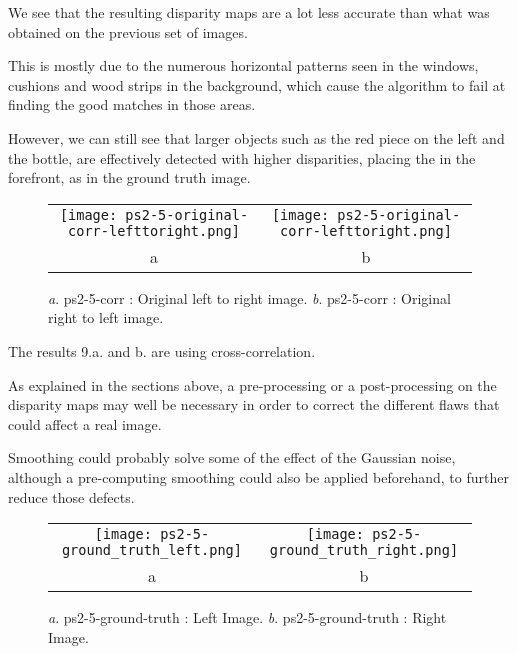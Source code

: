 \documentclass[a4paper,11pt]{article}
\begin{document}
We see that the resulting disparity maps are a lot less accurate than what was obtained on the previous set of images.

This is mostly due to the numerous horizontal patterns seen in the windows, cushions and wood strips in the background, which cause the algorithm to fail at finding the good matches in those areas.

However, we can still see that larger objects such as the red piece on the left and the bottle, are effectively detected with higher disparities, placing the in the forefront, as in the ground truth image.

 \begin{figure}[H]
\begin{center}
\begin{tabular}{cc}
	\texttt{[image: ps2-5-original-corr-lefttoright.png]}&
	\texttt{[image: ps2-5-original-corr-lefttoright.png]}\\
	a&b
\end{tabular}
\end{center}
\caption{ 
\textit{a}. ps2-5-corr : Original left to right image.  \textit{b}. ps2-5-corr : Original right to left image. }
\label{ps2-1}
\end{figure}

The results 9.a. and b. are using cross-correlation.

As explained in the sections above, a pre-processing or a post-processing on the disparity maps may well be necessary in order to correct the different flaws that could affect a real image.

Smoothing could probably solve some of the effect of the Gaussian noise, although a pre-computing smoothing could also be applied beforehand, to further reduce those defects.



 \begin{figure}[H]
\begin{center}
\begin{tabular}{cc}
	\texttt{[image: ps2-5-ground\_truth\_left.png]}&
	\texttt{[image: ps2-5-ground\_truth\_right.png]}\\
	a&b
\end{tabular}
\end{center}
\caption{ 
\textit{a}. ps2-5-ground-truth : Left Image.  \textit{b}. ps2-5-ground-truth : Right Image. }
\label{ps2-1}
\end{figure}
\end{document}
